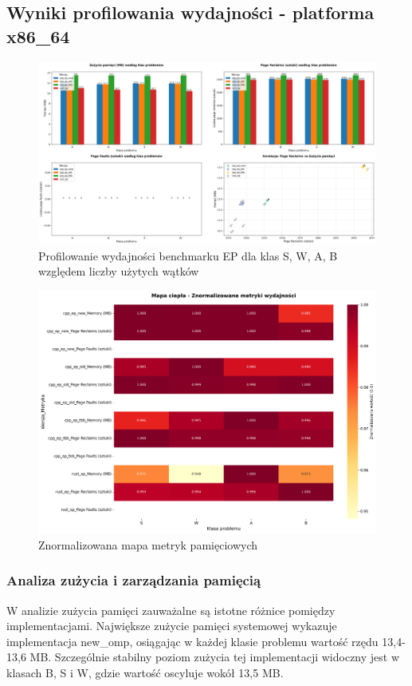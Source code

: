 \subsection{Wyniki profilowania wydajności - platforma x86\_64}
\begin{figure}[H]
    \centering
    \includegraphics[width=\textwidth]{analiza/images/parallel/ep/x86/chart_01_memory_comparison.png}
    \caption{Profilowanie wydajności benchmarku EP dla klas S, W, A, B względem liczby użytych wątków}
    \label{ep_porownanie_zuzycia_pamieci_x86_64}
\end{figure}
\begin{figure}[H]
    \centering
    \includegraphics[width=\textwidth]{analiza/images/parallel/ep/x86/chart_03_heatmap.png}
    \caption{Znormalizowana mapa metryk pamięciowych}
    \label{ep_znormalizowana_mapa_metryk}
\end{figure}
\subsubsection{Analiza zużycia i zarządzania pamięcią}
W analizie zużycia pamięci zauważalne są istotne różnice pomiędzy implementacjami. Największe zużycie pamięci systemowej wykazuje implementacja new\_omp, osiągając w każdej klasie problemu wartość rzędu 13,4-13,6 MB. Szczególnie stabilny poziom zużycia tej implementacji widoczny jest w klasach B, S i W, gdzie wartość oscyluje wokół 13,5 MB.


